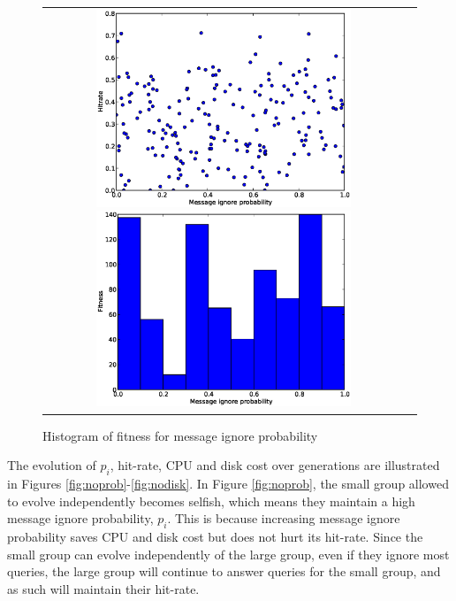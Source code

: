 \documentclass[12pt,journal,draftcls,letterpaper,onecolumn]{IEEEtran}
\begin{document}
\begin{figure}
\begin{tabular}{c c}
\begin{minipage}[t]{3in}
\includegraphics[width=3in]{hitrate1}
\caption{Hitrate for message ignore probability}
\label{fig:nohitrate}
\end{minipage}
\begin{minipage}[t]{3in}
\includegraphics[width=3in]{fitness1}
\caption{Histogram of fitness for message ignore probability}
\label{fig:fitness1}
\end{minipage}
\end{tabular}
\end{figure}

The evolution of $p_i$, hit-rate, CPU and disk cost over generations are
illustrated in Figures \ref{fig:noprob}-\ref{fig:nodisk}. 
In Figure \ref{fig:noprob}, the small group allowed to evolve independently becomes selfish, 
which means they maintain a high message ignore probability, $p_i$. This is because increasing
message ignore probability saves CPU and disk cost but does not hurt its
hit-rate.  Since the small group can evolve independently of the large group,
even if they ignore most queries, the large group will continue to answer
queries for the small group, and as such will maintain their hit-rate.
\end{document}
